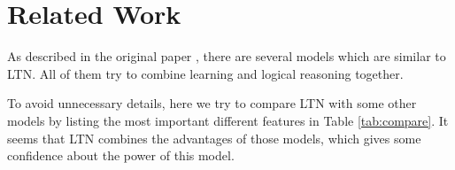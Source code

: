 
\section{Related Work}

As described in the original paper \cite{serafini2016logic}, there are several models which are similar to LTN. All of them try to combine learning and logical reasoning together.

To avoid unnecessary details, here we try to compare LTN with some other models by listing the most important different features in Table \ref{tab:compare}. It seems that LTN combines the advantages of those models, which gives some confidence about the power of this model.
